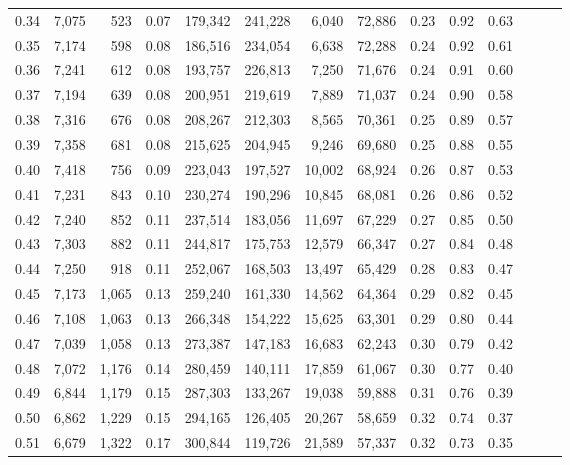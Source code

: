 \begin{tabular}{rrrrrrrrrrrrrr}
0.34 &   7,075 &    523 &  0.07 &  179,342 &  241,228 &   6,040 &  72,886 &  0.23 &  0.92 &      0.63 \\
0.35 &   7,174 &    598 &  0.08 &  186,516 &  234,054 &   6,638 &  72,288 &  0.24 &  0.92 &      0.61 \\
0.36 &   7,241 &    612 &  0.08 &  193,757 &  226,813 &   7,250 &  71,676 &  0.24 &  0.91 &      0.60 \\
0.37 &   7,194 &    639 &  0.08 &  200,951 &  219,619 &   7,889 &  71,037 &  0.24 &  0.90 &      0.58 \\
0.38 &   7,316 &    676 &  0.08 &  208,267 &  212,303 &   8,565 &  70,361 &  0.25 &  0.89 &      0.57 \\
0.39 &   7,358 &    681 &  0.08 &  215,625 &  204,945 &   9,246 &  69,680 &  0.25 &  0.88 &      0.55 \\
0.40 &   7,418 &    756 &  0.09 &  223,043 &  197,527 &  10,002 &  68,924 &  0.26 &  0.87 &      0.53 \\
0.41 &   7,231 &    843 &  0.10 &  230,274 &  190,296 &  10,845 &  68,081 &  0.26 &  0.86 &      0.52 \\
0.42 &   7,240 &    852 &  0.11 &  237,514 &  183,056 &  11,697 &  67,229 &  0.27 &  0.85 &      0.50 \\
0.43 &   7,303 &    882 &  0.11 &  244,817 &  175,753 &  12,579 &  66,347 &  0.27 &  0.84 &      0.48 \\
0.44 &   7,250 &    918 &  0.11 &  252,067 &  168,503 &  13,497 &  65,429 &  0.28 &  0.83 &      0.47 \\
0.45 &   7,173 &  1,065 &  0.13 &  259,240 &  161,330 &  14,562 &  64,364 &  0.29 &  0.82 &      0.45 \\
0.46 &   7,108 &  1,063 &  0.13 &  266,348 &  154,222 &  15,625 &  63,301 &  0.29 &  0.80 &      0.44 \\
0.47 &   7,039 &  1,058 &  0.13 &  273,387 &  147,183 &  16,683 &  62,243 &  0.30 &  0.79 &      0.42 \\
0.48 &   7,072 &  1,176 &  0.14 &  280,459 &  140,111 &  17,859 &  61,067 &  0.30 &  0.77 &      0.40 \\
0.49 &   6,844 &  1,179 &  0.15 &  287,303 &  133,267 &  19,038 &  59,888 &  0.31 &  0.76 &      0.39 \\
0.50 &   6,862 &  1,229 &  0.15 &  294,165 &  126,405 &  20,267 &  58,659 &  0.32 &  0.74 &      0.37 \\
0.51 &   6,679 &  1,322 &  0.17 &  300,844 &  119,726 &  21,589 &  57,337 &  0.32 &  0.73 &      0.35 \\

\end{tabular}

